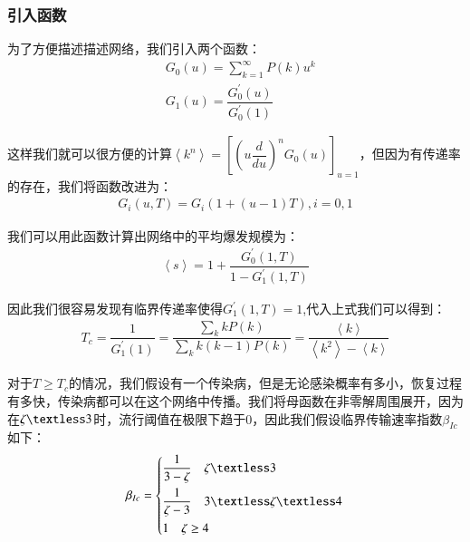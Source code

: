 \documentclass[UTF8]{ctexart}
\begin{document}
\subsubsection{引入函数}
\par 为了方便描述描述网络，我们引入两个函数：
\begin{equation}
	\begin{aligned}
		&G_{0}(u)=\sum\limits_{k=1}^{\infty}P(k)u^{k}\\
		&G_{1}(u)=\dfrac{G_{0}^{\prime}(u)}{G_{0}^{\prime}(1)}
	\end{aligned}
\end{equation}
\par 这样我们就可以很方便的计算$\left\langle k^{n}\right\rangle=[(u\dfrac{d}{du})^{n}G_{0}(u)]_{u=1}$，但因为有传递率的存在，我们将函数改进为：
\begin{equation}
	\begin{aligned}
		G_{i}(u,T)=G_{i}(1+(u-1)T),i=0,1
	\end{aligned}
\end{equation}
\par 我们可以用此函数计算出网络中的平均爆发规模为：
\begin{equation}
	\begin{aligned}
		\left\langle s\right\rangle=1+\dfrac{G_{0}^{\prime}(1,T)}{1-G_{1}^{\prime}(1,T)}
	\end{aligned}
\end{equation}
\par 因此我们很容易发现有临界传递率使得$G_{1}^{\prime}(1,T)=1$,代入上式我们可以得到：
\begin{equation}
	\begin{aligned}
		T_{c}=\dfrac{1}{G_{1}^{\prime}(1)}=\dfrac{\sum\limits_{k}kP(k)}{\sum\limits_{k}k(k-1)P(k)}=\dfrac{\left\langle k\right\rangle}{\left\langle k^{2}\right\rangle-\left\langle k\right\rangle}
	\end{aligned}
\end{equation}
\par 对于$T\ge T_{c}$的情况，我们假设有一个传染病，但是无论感染概率有多小，恢复过程有多快，传染病都可以在这个网络中传播。我们将母函数在非零解周围展开，因为在$\zeta \textless 3$时，流行阈值在极限下趋于0，因此我们假设临界传输速率指数$\beta_{Ic}$如下：
\begin{equation}
    \beta_{Ic}=\left\{
    \begin{aligned}
	&\dfrac{1}{3-\zeta}\quad \zeta \textless 3 \\
	&\dfrac{1}{\zeta-3}\quad 3\textless \zeta \textless 4 \\
	&1\quad \zeta \ge 4
    \end{aligned}
    \right.
\end{equation}
\end{document}
